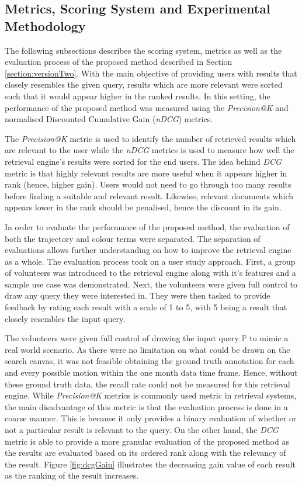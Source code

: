\subsection{Metrics, Scoring System and Experimental Methodology}

The following subsections describes the scoring system, metrics as well as the evaluation process of the proposed method described in Section \ref{section:versionTwo}. With the main objective of providing users with results that closely resembles the given query, results which are more relevant were sorted such that it would appear higher in the ranked results. In this setting, the performance of the proposed method was measured using the \textit{Precision@K} and normalised Discounted Cumulative Gain (\textit{nDCG}) metrics.

The \textit{Precision@K} metric is used to identify the number of retrieved results which are relevant to the user while the \textit{nDCG} metrics is used to measure how well the retrieval engine's results were sorted for the end users. The idea behind \textit{DCG} metric is that highly relevant results are more useful when it appears higher in rank (hence, higher gain). Users would not need to go through too many results before finding a suitable and relevant result. Likewise, relevant documents which appears lower in the rank should be penalised, hence the discount in its gain.

In order to evaluate the performance of the proposed method, the evaluation of both the trajectory and colour terms were separated. The separation of evaluations allows further understanding on how to improve the retrieval engine as a whole. The evaluation process took on a user study approach.
First, a group of volunteers was introduced to the retrieval engine along with it's features and a sample use case was demonstrated. Next, the volunteers were given full control to draw any query they were interested in. They were then tasked to provide feedback by rating each result with a scale of 1 to 5, with 5 being a result that closely resembles the input query.

The volunteers were given full control of drawing the input query $\mathbb{P}$ to mimic a real world scenario. As there were no limitation on what could be drawn on the search canvas, it was not feasible obtaining the ground truth annotation for each and every possible motion within the one month data time frame. Hence, without these ground truth data, the recall rate could not be measured for this retrieval engine.
While \textit{Precision@K} metrics is commonly used metric in retrieval systems, the main disadvantage of this metric is that the evaluation process is done in a coarse manner. This is because it only provides a binary evaluation of whether or not a particular result is relevant to the query. On the other hand, the \textit{DCG} metric is able to provide a more granular evaluation of the proposed method as the results are evaluated based on its ordered rank along with the relevancy of the result. Figure \ref{fig:dcgGain} illustrates the decreasing gain value of each result as the ranking of the result increases.

